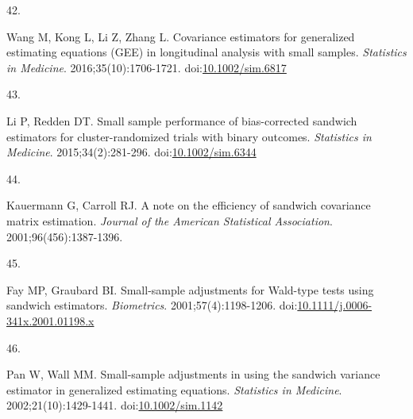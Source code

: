 \documentclass[
  11pt,
]{article}
\newlength{\cslhangindent}
\newlength{\csllabelwidth}
\newenvironment{CSLReferences}[2] %
 {\begin{list}{}{%
  \setlength{\itemindent}{0pt}
  \setlength{\leftmargin}{0pt}
  \setlength{\parsep}{0pt}
  \ifodd #1
   \setlength{\leftmargin}{\cslhangindent}
   \setlength{\itemindent}{-1\cslhangindent}
  \fi
  \setlength{\itemsep}{#2\baselineskip}}}
 {\end{list}}
\newcommand{\CSLLeftMargin}[1]{\parbox[t]{\csllabelwidth}{\strut#1\strut}}
\newcommand{\CSLRightInline}[1]{\parbox[t]{\linewidth - \csllabelwidth}{\strut#1\strut}}
\begin{document}
\begin{CSLReferences}{0}{1}
\CSLLeftMargin{42. }%
\CSLRightInline{Wang M, Kong L, Li Z, Zhang L. Covariance estimators for generalized estimating equations ({GEE}) in longitudinal analysis with small samples. \emph{Statistics in Medicine}. 2016;35(10):1706-1721. doi:\href{https://doi.org/10.1002/sim.6817}{10.1002/sim.6817}}

\CSLLeftMargin{43. }%
\CSLRightInline{Li P, Redden DT. Small sample performance of bias-corrected sandwich estimators for cluster-randomized trials with binary outcomes. \emph{Statistics in Medicine}. 2015;34(2):281-296. doi:\href{https://doi.org/10.1002/sim.6344}{10.1002/sim.6344}}

\CSLLeftMargin{44. }%
\CSLRightInline{Kauermann G, Carroll RJ. A note on the efficiency of sandwich covariance matrix estimation. \emph{Journal of the American Statistical Association}. 2001;96(456):1387-1396.}

\CSLLeftMargin{45. }%
\CSLRightInline{Fay MP, Graubard BI. Small-sample adjustments for {Wald}-type tests using sandwich estimators. \emph{Biometrics}. 2001;57(4):1198-1206. doi:\href{https://doi.org/10.1111/j.0006-341x.2001.01198.x}{10.1111/j.0006-341x.2001.01198.x}}

\CSLLeftMargin{46. }%
\CSLRightInline{Pan W, Wall MM. Small-sample adjustments in using the sandwich variance estimator in generalized estimating equations. \emph{Statistics in Medicine}. 2002;21(10):1429-1441. doi:\href{https://doi.org/10.1002/sim.1142}{10.1002/sim.1142}}

\end{CSLReferences}
\end{document}
